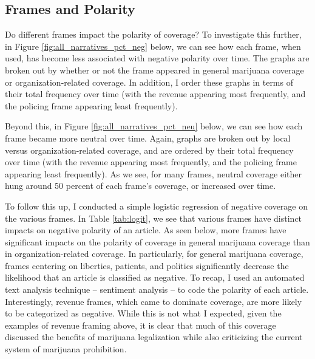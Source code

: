 \subsection{Frames and Polarity}

Do different frames impact the polarity of coverage? To investigate this further, in Figure \ref{fig:all_narratives_pct_neg} below, we can see how each frame, when used, has become less associated with negative polarity over time. The graphs are broken out by whether or not the frame appeared in general marijuana coverage or organization-related coverage. In addition, I order these graphs in terms of their total frequency over time (with the revenue appearing most frequently, and the policing frame appearing least frequently). 

Beyond this, in Figure \ref{fig:all_narratives_pct_neu} below, we can see how each frame became more neutral over time. Again, graphs are broken out by local versus organization-related coverage, and are ordered by their total frequency over time (with the revenue appearing most frequently, and the policing frame appearing least frequently). As we see, for many frames, neutral coverage either hung around 50 percent of each frame's coverage, or increased over time. 







To follow this up, I conducted a simple logistic regression of negative coverage on the various frames. In Table \ref{tab:logit}, we see that various frames have distinct impacts on negative polarity of an article. As seen below, more  frames have significant impacts on the polarity of coverage in general marijuana coverage than in organization-related coverage. In particularly, for general marijuana coverage, frames centering on liberties, patients, and politics significantly decrease the likelihood that an article is classified as negative. To recap, I used an automated text analysis technique -- sentiment analysis -- to code the polarity of each article. Interestingly, revenue frames, which came to dominate coverage, are more likely to be categorized as negative. While this is not what I expected, given the examples of revenue framing above, it is clear that much of this coverage discussed the benefits of marijuana legalization while also criticizing the current system of marijuana prohibition. 

